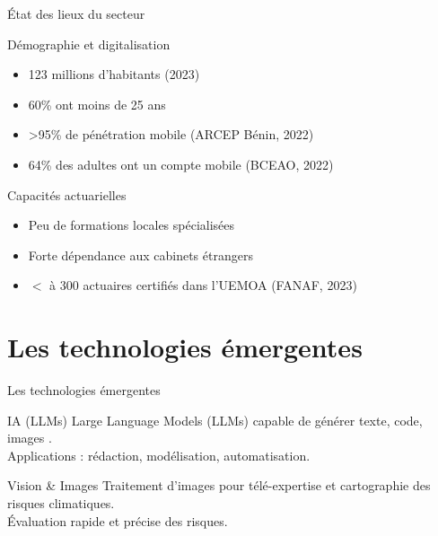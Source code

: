 \documentclass{beamer}
\begin{document}
\begin{frame}{État des lieux du secteur}
	\begin{block}{Démographie et digitalisation}
	\begin{itemize}
		\item 123 millions d’habitants (2023)
		\item 60\% ont moins de 25 ans
		\item >95\% de pénétration mobile (ARCEP Bénin, 2022)
		\item 64\% des adultes ont un compte mobile (BCEAO, 2022)
	\end{itemize}
	\end{block}
	\begin{block}{Capacités actuarielles}
		\begin{itemize}
		\item Peu de formations locales spécialisées
		\item Forte dépendance aux cabinets étrangers
		\item  $<$ à 300 actuaires certifiés dans l’UEMOA (FANAF, 2023)

\end{itemize}
			\end{block}
\end{frame}


\section{Les technologies émergentes}
\begin{frame}{ Les technologies émergentes}
	
	\begin{block}{ IA (LLMs)}
		Large Language Models  (LLMs) capable de générer texte, code, images .\\
		Applications : rédaction, modélisation, automatisation.
	\end{block}
	
	\begin{block}{Vision \& Images}
		Traitement d’images pour télé-expertise et cartographie des risques climatiques.\\
		Évaluation rapide et précise des risques.
	\end{block}
	
	
	
	
\end{frame}
\end{document}
